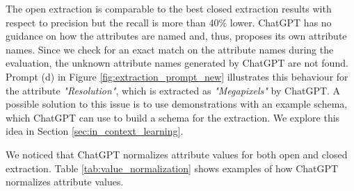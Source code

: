 The open extraction is comparable to the best closed extraction results with respect to precision but the recall is more than 40\% lower. ChatGPT has no guidance on how the attributes are named and, thus, proposes its own attribute names. Since we check for an exact match on the attribute names during the evaluation, the unknown attribute names generated by ChatGPT are not found. Prompt (d) in Figure \ref{fig:extraction_prompt_new} illustrates this behaviour for the attribute \emph{"Resolution"}, which is extracted as \emph{"Megapixels"} by ChatGPT. A possible solution to this issue is to use demonstrations with an example schema, which ChatGPT can use to build a schema for the extraction. We explore this idea in Section \ref{sec:in_context_learning}.

We noticed that ChatGPT normalizes attribute values for both open and closed extraction. Table \ref{tab:value_normalization} shows examples of how ChatGPT normalizes attribute values.

